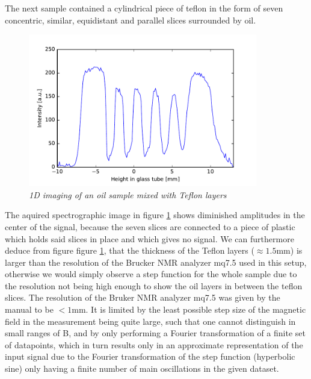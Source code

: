 \noindent
The next sample contained a cylindrical piece of teflon in the form of seven concentric, similar, equidistant and parallel slices surrounded by oil.
\begin{figure}[h]
	\includegraphics[width=100mm]{OilTef}
	\centering
	\caption{\itshape 1D imaging of an oil sample mixed with Teflon layers}
	\label{fig:12}
\end{figure}
\noindent
 The aquired spectrographic image in figure \ref{fig:12} shows diminished amplitudes in the center of the signal, because the seven slices are connected to a piece of plastic which holds said slices in place and which gives no signal.
 We can furthermore deduce from figure figure \ref{fig:12}, that the thickness of the Teflon layers ($\approx 1.5 \mathrm{mm}$) is larger than the resolution of the Brucker NMR analyzer mq7.5 used in this setup, otherwise we would simply observe a step function for the whole sample due to the resolution not being high enough to show the oil layers in between the teflon slices. The resolution of the Bruker NMR analyzer mq7.5 was given by the manual to be $< 1 \mathrm{mm}$. It is limited by the least possible step size of the magnetic field in the measurement being quite large, such that one cannot distinguish in small ranges of B, and by only performing a Fourier transformation of a finite set of datapoints, which in turn results only in an approximate representation of the input signal due to the Fourier transformation of the step function (hyperbolic sine) only having a finite number of main oscillations in the given dataset.
\\
